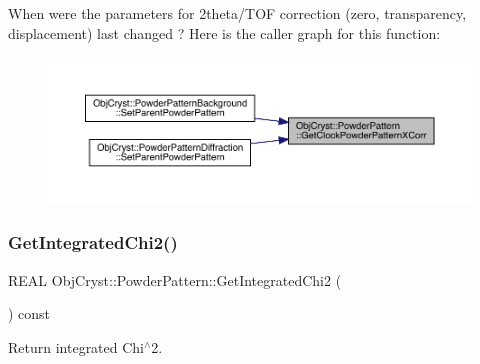 When were the parameters for 2theta/\+T\+OF correction (zero, transparency, displacement) last changed ? Here is the caller graph for this function\+:
\nopagebreak
\begin{figure}[H]
\begin{center}
\leavevmode
\includegraphics[width=350pt]{class_obj_cryst_1_1_powder_pattern_af90dc3f2baa8c13f811ecf119cc49c95_icgraph}
\end{center}
\end{figure}
\mbox{\label{class_obj_cryst_1_1_powder_pattern_a12ffd532da8462d03b56cc8e2be210ba}} 
\subsubsection{\texorpdfstring{GetIntegratedChi2()}{GetIntegratedChi2()}}
{\footnotesize\ttfamily R\+E\+AL Obj\+Cryst\+::\+Powder\+Pattern\+::\+Get\+Integrated\+Chi2 (\begin{DoxyParamCaption}{ }\end{DoxyParamCaption}) const}



Return integrated Chi$^\wedge$2. 

